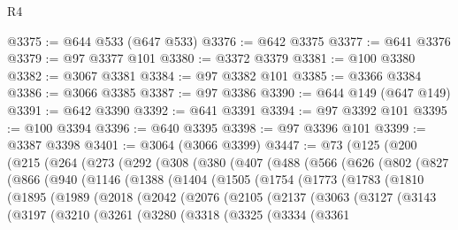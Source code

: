 \begin{lexlean}{R4}
\begin{coremodule}
@3375 := @644 @533 (@647 @533)
@3376 := @642 @3375
@3377 := @641 @3376
@3379 := @97 @3377 @101
@3380 := @3372 @3379
@3381 := @100 @3380
@3382 := @3067 @3381
@3384 := @97 @3382 @101
@3385 := @3366 @3384
@3386 := @3066 @3385
@3387 := @97 @3386
@3390 := @644 @149 (@647 @149)
@3391 := @642 @3390
@3392 := @641 @3391
@3394 := @97 @3392 @101
@3395 := @100 @3394
@3396 := @640 @3395
@3398 := @97 @3396 @101
@3399 := @3387 @3398
@3401 := @3064 (@3066 @3399)
@3447 := @73
    (@125
      (@200
        (@215
          (@264
            (@273
              (@292
                (@308
                  (@380
                    (@407
                      (@488
                        (@566
                          (@626
                            (@802
                              (@827
                                (@866
                                  (@940
                                    (@1146
                                      (@1388
                                        (@1404
                                          (@1505
                                            (@1754
                                              (@1773
                                                (@1783
                                                  (@1810
                                                    (@1895
                                                      (@1989
                                                        (@2018
                                                          (@2042
                                                            (@2076
                                                              (@2105
                                                                (@2137
                                                                  (@3063
                                                                    (@3127
                                                                      (@3143
                                                                        (@3197
                                                                          (@3210
                                                                            (@3261
                                                                              (@3280
                                                                                (@3318
                                                                                  (@3325
                                                                                    (@3334
                                                                                      (@3361

\end{coremodule}
\end{lexlean}
